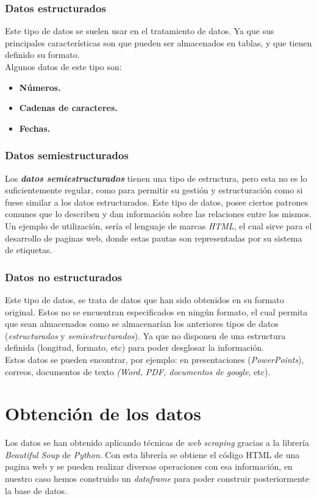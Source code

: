 \documentclass[11pt]{diazessay} %
\begin{document}
\subsubsection*{Datos estructurados}
Este tipo de datos se suelen usar en el tratamiento de datos. Ya que sus principales características son que pueden ser almacenados en tablas, y que tienen definido su formato.\\
Algunos datos de este tipo son:

\begin{itemize}
	\item \textbf{Números.}
	\item \textbf{Cadenas de caracteres.}
	\item \textbf{Fechas.}
\end{itemize}

\subsubsection*{Datos semiestructurados}
Los \textbf{\textit{datos semiestructurados}} tienen una tipo de estructura, pero esta no es lo suficientemente regular, como para permitir su gestión y estructuración como si fuese similar a los datos estructurados.
Este tipo de datos, posee ciertos patrones comunes que lo describen y dan información sobre las relaciones entre los mismos.\\
Un ejemplo de utilización, sería el lenguaje de marcas \textit{HTML}, el cual sirve para el desarrollo de paginas web, donde estas pautas son representadas por su sistema de etiquetas.

\subsubsection*{Datos no estructurados}
Este tipo de datos, se trata  de datos que han sido obtenidos en su formato original. Estos no se encuentran especificados en ningún formato, el cual permita que sean almacenados como se almacenarían los anteriores tipos de datos (\textit{estructurados} y \textit{semiestructurados}). Ya que no disponen de una estructura definida (longitud, formato, etc) para poder desglosar la información.\\
Estos datos se pueden encontrar, por ejemplo: en presentaciones (\textit{PowerPoints}), correos, documentos de texto \textit{(Word, PDF, documentos de google}, etc).

\newpage
\section*{Obtención de los datos}
Los datos se han obtenido aplicando técnicas de \textit{web scraping} \cite{web_scraping} gracias a la librería \textit{Beautiful Soup} \cite{Beautiful_Soup} de \textit{Python}. Con esta librería se obtiene el código HTML de una pagina web y se pueden realizar diversas operaciones con esa información, en nuestro caso hemos construido un \textit{dataframe} \cite{dataframe} para poder construir posteriormente la base de datos.
\end{document}
